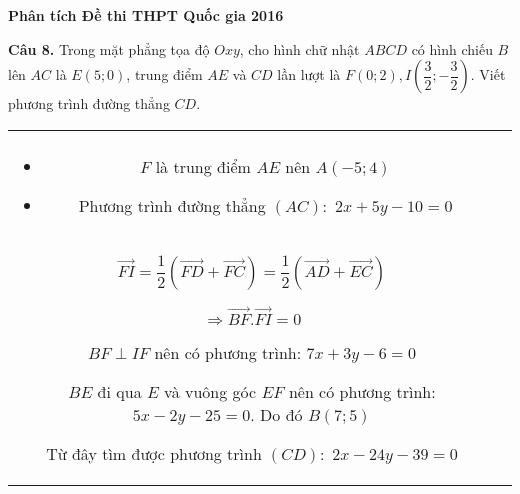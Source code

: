 \documentclass[handout]{beamer} %
\newcommand\Fontvi{\fontsize{9}{7.2}\selectfont}
\newcommand{\cau}[2]{\begin{block}{}
		{\color{red}\textbf{Câu #1.}} #2
	\end{block}
}
\newcommand{\divColEight}[2]{\begin{tabular}{cc}
		\begin{minipage}[c]{5.3cm} 
			#1
		\end{minipage}&
		\begin{minipage}[c]{6.4cm} 
			#2
		\end{minipage}
	\end{tabular}
}
\begin{document}
		\begin{frame}{\textbf{\qquad Phân tích Đề thi THPT Quốc gia 2016}}~\\[-20pt]
			\Fontvi
			\cau{8}{Trong mặt phẳng tọa độ $Oxy$, cho hình chữ nhật $ABCD$ có hình chiếu $B$ lên $AC$ là $E(5;0)$, trung điểm $AE$ và $CD$ lần lượt là $F(0;2), I\left(\dfrac{3}{2};-\dfrac{3}{2}\right)$. Viết phương trình đường thẳng $CD$.}
			\divColEight{
				\begin{center}
					
				\end{center}~\\[-20pt]
				\begin{itemize}
					\setlength{\itemindent}{-0.4cm}
					\item $F$ là trung điểm $AE$ nên $A(-5;4)$
					\item Phương trình đường thẳng $(AC):$ $2x+5y-10=0$
				\end{itemize}
			}{
			\begin{itemize}
				\setlength{\itemindent}{-0.2cm}
				\item Ta đi chứng minh: $BF\perp IF$.
				\item $\overrightarrow{BF}=\dfrac{1}{2}\left(\overrightarrow{BA}+ \overrightarrow{BE}\right)$\\[8pt]
				\item $\overrightarrow{FI}=\dfrac{1}{2}\left(\overrightarrow{FD}+\overrightarrow{FC}\right)=\dfrac{1}{2}\left(\overrightarrow{AD}+\overrightarrow{EC}\right)$
				\item $\Rightarrow \overrightarrow{BF}.\overrightarrow{FI}=0$
				\item $BF\perp IF$ nên có phương trình: $7x+3y-6=0$
				\item $BE$ đi qua $E$ và vuông góc $EF$ nên có phương trình: $5x-2y-25=0$.
				Do đó $B(7;5)$	
				\item Từ đây tìm được phương trình $(CD):$ $2x-24y-39=0$
			\end{itemize}
		}
	\end{frame}
	
\end{document}
